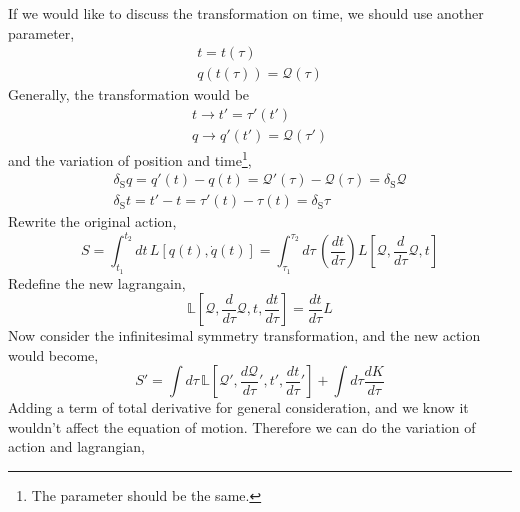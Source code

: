 \documentclass[12pt]{article}
\numberwithin{equation}{section}
\begin{document}
If we would like to discuss the transformation on time, we should use another parameter,
\begin{equation}
    \begin{split}
        t = t(\tau)\\
        q(t(\tau)) = \mathcal{Q}(\tau)
    \end{split}
\end{equation}
Generally, the transformation would be
\begin{equation}
    \begin{split}
        t\rightarrow t' = \tau'(t')\\
        q\rightarrow q'(t') = \mathcal{Q}(\tau')
    \end{split}
\end{equation}
and the variation of position and time\footnote{The parameter should be the same.},
\begin{equation}
    \begin{split}
        \delta_{\text{S}}q = q'(t)-q(t) =\mathcal{Q}'(\tau) - \mathcal{Q}(\tau)= \delta_{\text{S}}\mathcal{Q}\\
        \delta_{\text{S}}t = t'-t = \tau'(t) -\tau(t) = \delta_{\text{S}}\tau
    \end{split}
\end{equation}
Rewrite the original action,
\begin{equation}
    S = \int_{t_1}^{t_2}{dt\,L[q(t), \dot{q}(t)]} = \int_{\tau_1}^{\tau_2}{d\tau\,\left(\frac{dt}{d\tau}\right)L[\mathcal{Q}, \frac{d}{d\tau}\mathcal{Q}, t]}
\end{equation}
Redefine the new lagrangain,
\begin{equation}
    \mathbb{L}\left[\mathcal{Q}, \frac{d}{d\tau}\mathcal{Q},t,\frac{dt}{d\tau}\right] = \frac{dt}{d\tau}L
\end{equation}
Now consider the infinitesimal symmetry transformation, and the new action would become,
\begin{equation}
    S' = \int{d\tau\,\mathbb{L}\left[\mathcal{Q}', \frac{d\mathcal{Q}}{d\tau}', t',\frac{dt}{d\tau}'\right]} + \int{d\tau\frac{dK}{d\tau}}
\end{equation}
Adding a term of total derivative for general consideration, and we know it wouldn't affect the equation of motion.
Therefore we can do the variation of action and lagrangian,
\end{document}
